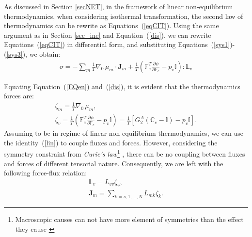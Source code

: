\documentclass[runningheads]{llncs}
\newcommand{\F}{\ensuremath{\mathbb{F}}}
\newcommand{\LL}{\ensuremath{\mathbb{L}}}
\begin{document}
As discussed in Section \ref{secNET}, in the framework of linear non-equilibrium thermodynamics, when considering isothermal transformation, the second law of thermodynamics can be rewrite as Equations~(\ref{eqCIT}). Using the same argument as in Section \ref{sec_ine} and Equation~(\ref{dis}), we can rewrite Equations~(\ref{eqCIT}) in differential form, and substituting Equations~(\ref{sys1})-(\ref{sys3}), we obtain:
\begin{equation}
\begin{aligned}
 \sigma = -  \sum_m \frac{1}{T}\nabla_0 \,\mu_m \cdot \mathbf{J}_m + \frac{1}{T}\left( \F_e^T\frac{\partial \psi}{\partial \F_e}-p_v\mathbb{I}\right):\mathbb{L}_v\label{EQen}
\end{aligned} 
\end{equation}

Equating Equation~(\ref{EQen}) and~(\ref{dis}), it is evident that the thermodynamics forces are:
\begin{gather}
\zeta_m = \frac{1}{T} \nabla_0 \,\mu_m, \label{vflow1}\\
\zeta_v = \frac{1}{T} \left( \F_e^T\frac{\partial \psi}{\partial \F_e}-p_v\mathbb{I}\right) = \frac{1}{T} \left[G^A_2(\mathbb{C}_e-\mathbb{I})-p_v\mathbb{I}\right].
\end{gather}
Assuming to be in regime of linear non-equilibrium thermodynamics, we can use the identity~(\ref{lin}) to couple fluxes and forces. However, considering the symmetry constraint from \textit{Curie's law}\footnote{Macroscopic causes can not have more element of symmetries than the effect they cause \cite{CIT}} , there can be no coupling between fluxes and forces of different tensorial nature. Consequently, we are left with the following force-flux relation:
\begin{gather}
\LL_v = L_{vv} \zeta_v,\label{vflow2}\\
\mathbf{J}_m = \sum_{k=s,1,\ldots,N} L_{mk} \zeta_k. \label{dif}
\end{gather}

\end{document}
